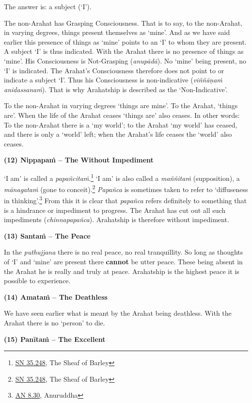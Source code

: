 The answer is: a subject (`I').

The non-Arahat has Grasping Consciousness. That is to say, to the non-Arahat, in varying degrees, things present themselves as `mine'. And as we have said earlier this presence of things as `mine' points to an `I' to whom they are present. A subject `I' is thus indicated. With the Arahat there is no presence of things as `mine'. His Consciousness is Not-Grasping (\emph{anupādā}). No `mine' being present, no `I' is indicated. The Arahat's Consciousness therefore does not point to or indicate a subject `I'. Thus his Consciousness is non-indicative (\emph{viññāṇaṁ anidassanaṁ}). That is why Arahatship is described as the `Non-Indicative'.

To the non-Arahat in varying degrees `things are mine'. To the Arahat, `things are'. When the life of the Arahat ceases `things are' also ceases. In other words: To the non-Arahat there is a `my world'; to the Arahat `my world' has ceased, and there is only a `world' left; when the Arahat's life ceases the `world' also ceases.

\textbf{(12) Nippapaṁ -- The Without Impediment}

`I am' is called a \emph{papañcitaṁ}.\footnote{\href{https://suttacentral.net/sn35.248/en/bodhi}{SN 35.248}, The Sheaf of Barley} `I am' is also called a \emph{maññitaṁ} (supposition), a \emph{mānagataṁ} (gone to conceit).\footnote{\href{https://suttacentral.net/sn35.248/en/bodhi}{SN 35.248}, The Sheaf of Barley} \emph{Papañca} is sometimes taken to refer to `diffuseness in thinking'.\footnote{\href{https://suttacentral.net/an8.30/en/bodhi}{AN 8.30}, Anuruddha} From this it is clear that \emph{papañca} refers definitely to something that is a hindrance or impediment to progress. The Arahat has cut out all such impediments (\emph{chinnapapañca}). Arahatship is therefore without impediment.

\textbf{(13) Santaṁ -- The Peace}

In the \emph{puthujjana} there is no real peace, no real tranquillity. So long as thoughts of `I' and `mine' are present there \textbf{cannot} be utter peace. These being absent in the Arahat he is really and truly at peace. Arahatship is the highest peace it is possible to experience.

\textbf{(14) Amataṁ -- The Deathless}

We have seen earlier what is meant by the Arahat being deathless. With the Arahat there is no `person' to die.

\textbf{(15) Panītaṁ -- The Excellent}

